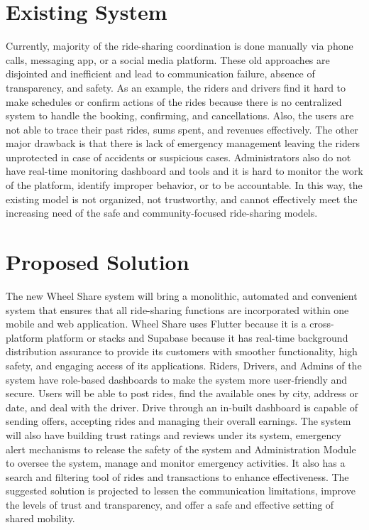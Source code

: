 \section{Existing System}
Currently, majority of the ride-sharing coordination is done manually via phone calls, messaging app, or a social media platform. These old approaches are disjointed and inefficient and lead to communication failure, absence of transparency, and safety\cite{chaudhry2018}. As an example, the riders and drivers find it hard to make schedules or confirm actions of the rides because there is no centralized system to handle the booking, confirming, and cancellations. Also, the users are not able to trace their past rides, sums spent, and revenues effectively. The other major drawback is that there is lack of emergency management leaving the riders unprotected in case of accidents or suspicious cases. Administrators also do not have real-time monitoring dashboard and tools and it is hard to monitor the work of the platform, identify improper behavior, or to be accountable. In this way, the existing model is not organized, not trustworthy, and cannot effectively meet the increasing need of the safe and community-focused ride-sharing models.

\section{Proposed Solution}
The new Wheel Share system will bring a monolithic, automated and convenient system that ensures that all ride-sharing functions are incorporated within one mobile and web application. Wheel Share uses Flutter because it is a cross-platform platform or stacks and Supabase because it has real-time background distribution assurance to provide its customers with smoother functionality, high safety, and engaging access of its applications. Riders, Drivers, and Admins of the system have role-based dashboards to make the system more user-friendly and secure. Users will be able to post rides, find the available ones by city, address or date, and deal with the driver. Drive through an in-built dashboard is capable of sending offers, accepting rides and managing their overall earnings\cite{acheampong2021}. The system will also have building trust ratings and reviews under its system, emergency alert mechanisms to release the safety of the system and Administration Module to oversee the system, manage and monitor emergency activities. It also has a search and filtering tool of rides and transactions to enhance effectiveness. The suggested solution is projected to lessen the communication limitations, improve the levels of trust and transparency, and offer a safe and effective setting of shared mobility. 



